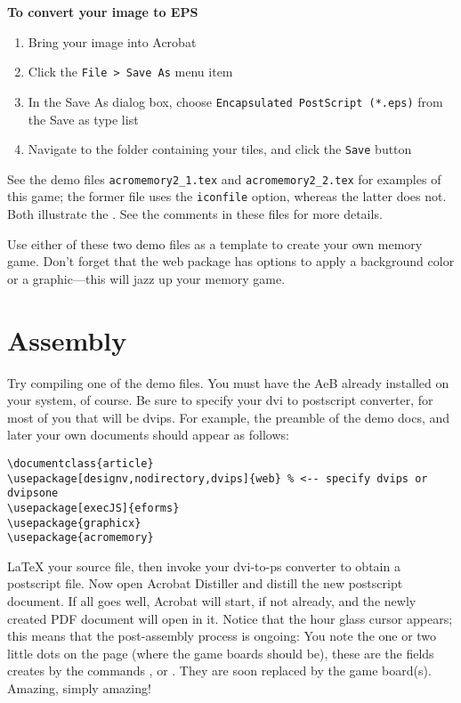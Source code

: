 \documentclass{article}
\begin{document}
\newtopic\textbf{To convert your image to EPS}
\begin{enumerate}
\item Bring your image into Acrobat
\item Click the \texttt{File > Save As} menu item
\item In the Save As dialog box, choose \texttt{Encapsulated PostScript (*.eps)} from the Save as type list
\item Navigate to the folder containing your tiles, and click the \texttt{Save} button
\end{enumerate}

\newtopic See the demo files \texttt{acromemory2\_1.tex} and
\texttt{acromemory2\_2.tex} for examples of this game; the former
file uses the \texttt{iconfile} option, whereas the latter does not.
Both illustrate the . See the comments in
these files for more details.

Use either of these two demo files as a template to create your own
memory game. Don't forget that the \textsf{web} package has options
to apply a background color or a graphic---this will jazz up your
memory game.

\section{Assembly}

Try compiling one of the demo files. You must have the AeB already
installed on your system, of course.  Be sure to specify your dvi to
postscript converter, for most of you that will be dvips. For example,
the preamble of the demo docs, and later your own documents should
appear as follows:\smallskip
\begin{Verbatim}[xleftmargin=20pt,fontsize=\fontsize{9}{11}\selectfont]
\documentclass{article}
\usepackage[designv,nodirectory,dvips]{web} % <-- specify dvips or dvipsone
\usepackage[execJS]{eforms}
\usepackage{graphicx}
\usepackage{acromemory}
\end{Verbatim}

\newtopic LaTeX your source file, then invoke your dvi-to-ps
converter to obtain a postscript file.
Now open Acrobat Distiller and distill the new postscript document.
If all goes well, Acrobat will start, if not already, and the newly
created PDF document will open in it. Notice that the hour glass
cursor appears; this means that the post-assembly process is
ongoing: You note the one or two little dots on the page (where the
game boards should be), these are the fields creates by the commands
,  or . They
are soon replaced by the game board(s). Amazing, simply amazing!
\end{document}
